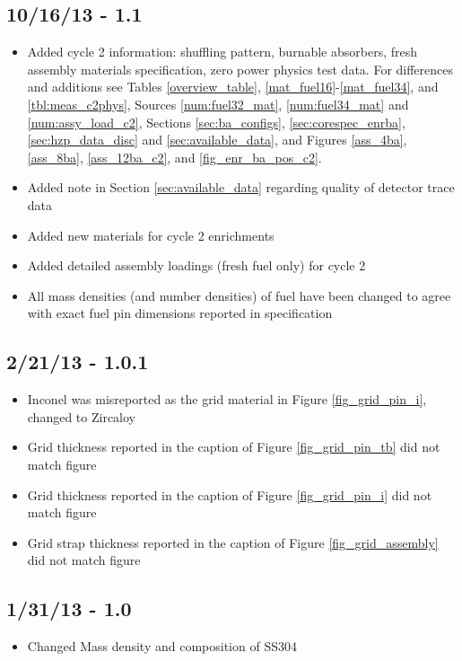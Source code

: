 \subsection*{10/16/13 - 1.1}
\begin{itemize}
  \item Added cycle 2 information: shuffling pattern, burnable absorbers, fresh
    assembly materials specification, zero power physics test data. For
    differences and additions see Tables \ref{overview_table},
    \ref{mat_fuel16}-\ref{mat_fuel34}, and \ref{tbl:meas_c2phys}, Sources
    \ref{num:fuel32_mat}, \ref{num:fuel34_mat} and \ref{num:assy_load_c2},
    Sections \ref{sec:ba_configs}, \ref{sec:corespec_enrba},
    \ref{sec:hzp_data_disc} and \ref{sec:available_data}, and Figures
    \ref{ass_4ba}, \ref{ass_8ba}, \ref{ass_12ba_c2}, and
    \ref{fig_enr_ba_pos_c2}.
  \item Added note in Section \ref{sec:available_data} regarding quality of
  detector trace data
  \item Added new materials for cycle 2 enrichments
  \item Added detailed assembly loadings (fresh fuel only) for cycle 2
  \item All mass densities (and number densities) of fuel have been changed to
        agree with exact fuel pin dimensions reported in specification
\end{itemize}

\subsection*{2/21/13 - 1.0.1}
\begin{itemize}
  \item Inconel was misreported as the grid material in Figure \ref{fig_grid_pin_i}, changed to Zircaloy
  \item Grid thickness reported in the caption of Figure \ref{fig_grid_pin_tb} did not match figure
  \item Grid thickness reported in the caption of Figure \ref{fig_grid_pin_i} did not match figure
  \item Grid strap thickness reported in the caption of Figure \ref{fig_grid_assembly} did not match figure
\end{itemize}

\subsection*{1/31/13 - 1.0}
\begin{itemize}
  \item Changed Mass density and composition of SS304
\end{itemize}

